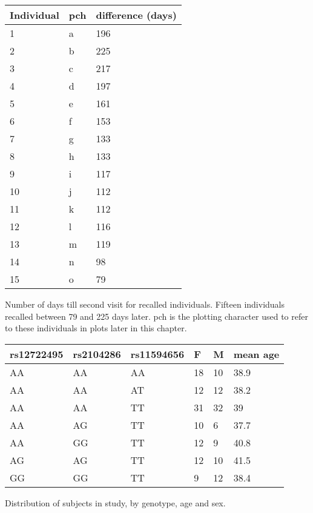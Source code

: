 \begin{table}[h]
\centering
\begin{tabular}{lll}
  \hline
  Individual      &  pch           & difference (days) \\
  \hline
  1      &  a       & 196 \\
  2      &  b       & 225 \\
  3      &  c       & 217 \\
  4      &  d       & 197 \\
  5      &  e       & 161 \\
  6      &  f       & 153 \\
  7      &  g       & 133 \\
  8      &  h       & 133 \\
  9      &  i       & 117 \\
  10     &  j       & 112 \\
  11     &  k       & 112 \\
  12     &  l       & 116 \\
  13     &  m       & 119 \\
  14     &  n       & 98 \\
  15     &  o       & 79  \\
  \hline
\end{tabular}
{Number of days till second visit for recalled individuals.}
{
Fifteen individuals recalled between 79 and 225 days later.
pch is the plotting character used to refer to these individuals in plots later in this chapter.
}
\end{table}

\begin{table}[h]
\centering
\begin{tabular}{llllll}
\hline
rs12722495 & rs2104286 & rs11594656 & F & M & mean age\\
\hline
AA & AA & AA & 18 & 10 & 38.9\\
AA & AA & AT & 12 & 12 & 38.2\\
AA & AA & TT & 31 & 32 & 39\\
AA & AG & TT & 10 & 6 & 37.7\\
AA & GG & TT & 12 & 9 & 40.8\\
AG & AG & TT & 12 & 10 & 41.5\\
GG & GG & TT & 9 & 12 & 38.4\\
\end{tabular}
{ Distribution of subjects in study, by genotype, age and sex.}
{
}
\end{table}


